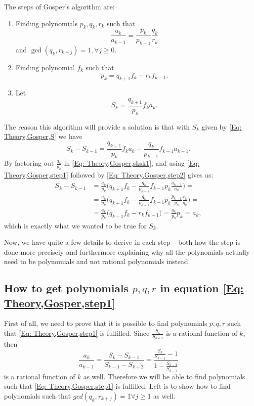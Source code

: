 The steps of Gosper's algorithm are:
\begin{enumerate}
  \item Finding polynomials $p_k,q_k,r_k$ such that
  \begin{equation}\label{Eq: Theory,Gosper,step1}
    \frac{a_k}{a_{k-1}} = \frac{p_k}{p_{k-1}}\frac{q_k}{r_k}
  \end{equation}
  and $\gcd(q_k,r_{k+j})=1, \forall j\geq 0$.
  \item Finding polynomial $f_k$ such that
  \begin{equation}\label{Eq: Theory,Gosper,step2}
    p_k=q_{k+1}f_k-r_kf_{k-1}.
  \end{equation}
  \item Let
  \begin{equation}\label{Eq: Theory,Gosper,S}
    S_k=\frac{q_{k+1}}{p_k}f_ka_k.
  \end{equation}
\end{enumerate}
The reason this algorithm will provide a solution is that with $S_k$ given by \ref{Eq: Theory,Gosper,S} we have
\begin{equation}\label{Eq: Theory,Gosper,sksk1}
  S_k-S_{k-1} = \frac{q_{k+1}}{p_k}f_ka_k-\frac{q_{k}}{p_{k-1}}f_{k-1}a_{k-1}.
\end{equation}
By factoring out $\frac{a_k}{p_k}$ in \ref{Eq: Theory,Gosper,sksk1}, and using \ref{Eq: Theory,Gosper,step1} followed by \ref{Eq: Theory,Gosper,step2} gives us:
\begin{equation}
  \begin{split}
    S_k-S_{k-1} & = \frac{a_k}{p_k}\Big(q_{k+1}f_k-\frac{q_k}{p_{k-1}}f_{k-1}p_k\frac{a_{k-1}}{a_k}\Big) = \\
    & =\frac{a_k}{p_k}\Big(q_{k+1}f_k-\frac{q_k}{p_{k-1}}f_{k-1}p_k\frac{p_{k-1}}{p_k}\frac{r_k}{q_k}\Big)= \\
    & = \frac{a_k}{p_k}\Big(q_{k+1}f_k-r_kf_{k-1}\Big) = \frac{a_k}{p_k}p_k = a_k,
  \end{split}
\end{equation}
which is exactly what we wanted to be true for $S_k$.

Now, we have quite a few details to derive in each step -- both how the step is done more precisely and furthermore explaining why all the polynomials actually need to be polynomials and not rational polynomials instead.

\subsection{How to get polynomials $p,q,r$ in equation \ref{Eq: Theory,Gosper,step1}}
First of all, we need to prove that it is possible to find polynomials $p,q,r$ such that \ref{Eq: Theory,Gosper,step1} is fulfilled. Since $\frac{S_k}{S_{k-1}}$ is a rational function of $k$, then
\begin{equation}
  \frac{a_k}{a_{k-1}}=\frac{S_k-S_{k-1}}{S_{k-1}-S_{k-2}}=\frac{\frac{S_k}{S_{k-1}}-1}{1-\frac{S_{k-2}}{S_{k-1}}}
\end{equation}
is a rational function of $k$ as well. Therefore we will be able to find polynomials such that \ref{Eq: Theory,Gosper,step1} is fulfilled. Left is to show how to find polynomials such that $gcd(q_k,r_{k+j})=1 \forall j\geq 1$ as well.

